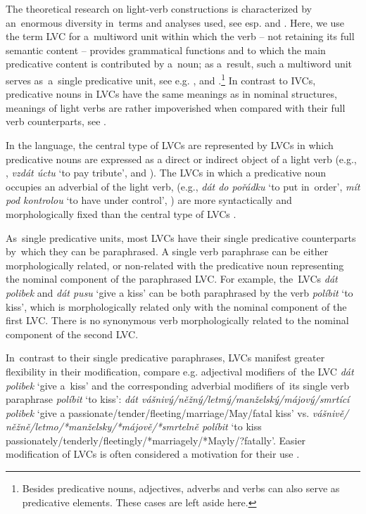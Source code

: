 \documentclass[output=paper
,modfonts
,nonflat]{langsci/langscibook}
\begin{document}
The theoretical research on light-verb constructions is characterized by 
an~enormous diversity in~terms and analyses used, see esp. \citet{amberber-10} 
and \citet{alsina-97}. Here, we use the term  LVC for a~multiword unit within 
which the verb -- not retaining its full semantic content -- provides 
grammatical functions and to which the main predicative content is contributed 
by a~noun; as a~result, such a multiword unit serves as~a~single predicative 
unit, see e.g. \citet{algeo-95}, \citet{alsina-97} and 
\citet{butt-2010}.\footnote{Besides predicative nouns, adjectives, adverbs and
verbs can also serve as predicative elements. These cases are left aside 
here.} In contrast to IVCs, predicative nouns in LVCs have the same meanings 
as in nominal structures, meanings of light verbs are rather impoverished when 
compared with their full verb counterparts, see . 

In the  language, the central type of LVCs are represented by LVCs in 
which predicative nouns are expressed as a direct or indirect object of a 
light verb (e.g., , 
\textit{vzdát úctu} `to pay tribute', and ). 
The LVCs in which a predicative noun occupies an adverbial of the light verb, 
(e.g., \textit{dát do pořádku} `to put in~order', \textit{mít pod kontrolou} 
`to have under control', ) are more syntactically and morphologically fixed than the 
central type of LVCs \citep{radimsky-10}.

As~single predicative units, most LVCs have their single predicative 
counterparts by~which they can be paraphrased. A single verb paraphrase can be
either morphologically related, or non-related with the predicative noun 
representing the nominal component of the paraphrased LVC. For example, the~LVCs 
\textit{dát polibek} and \textit{dát pusu} `give a kiss' can be both paraphrased 
by the verb \textit{políbit} `to kiss', which is morphologically related only 
with the nominal component of  the first LVC. There is no synonymous verb 
morphologically related to the nominal component of the second LVC.

In~contrast to their single predicative paraphrases, LVCs manifest greater 
flexibility in their modification, compare e.g. adjectival modifiers of~the LVC 
\textit{dát polibek} `give a~kiss' and the corresponding adverbial modifiers 
of~its single verb paraphrase \textit{políbit} `to kiss':  
\textit{dát váš\-ni\-vý/něž\-ný/let\-mý/man\-žel\-ský/má\-jo\-vý/smr\-tí\-cí 
po\-li\-bek} `give a pas\-sion\-ate/ten\-der/fleet\-ing/mar\-riage/May/fa\-tal 
kiss' vs. \textit{váš\-ni\-vě/ něž\-ně/let\-mo/*man\-žel\-sky/*má\-jo\-vě/*smr\-tel\-ně 
po\-lí\-bit} `to kiss pas\-sion\-ate\-ly/ten\-der\-ly/fleet\-ing\-ly/*mar\-riage\-ly/*May\-ly/?fa\-tal\-ly'.  Easier modification of LVCs is often considered a motivation for their use \citep{brinton-99}.
\end{document}
